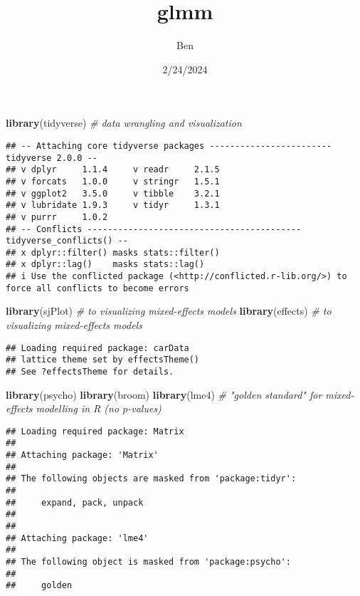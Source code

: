 \documentclass[
]{article}
\title{glmm}
\author{Ben}
\date{2/24/2024}
\newenvironment{Shaded}{\begin{snugshade}}{\end{snugshade}}
\newcommand{\CommentTok}[1]{\textcolor[rgb]{0.56,0.35,0.01}{\textit{#1}}}
\newcommand{\FunctionTok}[1]{\textcolor[rgb]{0.13,0.29,0.53}{\textbf{#1}}}
\newcommand{\NormalTok}[1]{#1}
\begin{document}
\maketitle

\begin{Shaded}
\begin{Highlighting}[]
\FunctionTok{library}\NormalTok{(tidyverse) }\CommentTok{\# data wrangling and visualization}
\end{Highlighting}
\end{Shaded}

\begin{verbatim}
## -- Attaching core tidyverse packages ------------------------ tidyverse 2.0.0 --
## v dplyr     1.1.4     v readr     2.1.5
## v forcats   1.0.0     v stringr   1.5.1
## v ggplot2   3.5.0     v tibble    3.2.1
## v lubridate 1.9.3     v tidyr     1.3.1
## v purrr     1.0.2     
## -- Conflicts ------------------------------------------ tidyverse_conflicts() --
## x dplyr::filter() masks stats::filter()
## x dplyr::lag()    masks stats::lag()
## i Use the conflicted package (<http://conflicted.r-lib.org/>) to force all conflicts to become errors
\end{verbatim}

\begin{Shaded}
\begin{Highlighting}[]
\FunctionTok{library}\NormalTok{(sjPlot) }\CommentTok{\# to visualizing mixed{-}effects models}
\FunctionTok{library}\NormalTok{(effects) }\CommentTok{\# to visualizing mixed{-}effects models}
\end{Highlighting}
\end{Shaded}

\begin{verbatim}
## Loading required package: carData
## lattice theme set by effectsTheme()
## See ?effectsTheme for details.
\end{verbatim}

\begin{Shaded}
\begin{Highlighting}[]
\FunctionTok{library}\NormalTok{(psycho)}
\FunctionTok{library}\NormalTok{(broom)}
\FunctionTok{library}\NormalTok{(lme4) }\CommentTok{\# "golden standard" for mixed{-}effects modelling in R (no p{-}values)}
\end{Highlighting}
\end{Shaded}

\begin{verbatim}
## Loading required package: Matrix
## 
## Attaching package: 'Matrix'
## 
## The following objects are masked from 'package:tidyr':
## 
##     expand, pack, unpack
## 
## 
## Attaching package: 'lme4'
## 
## The following object is masked from 'package:psycho':
## 
##     golden
\end{verbatim}
\end{document}
